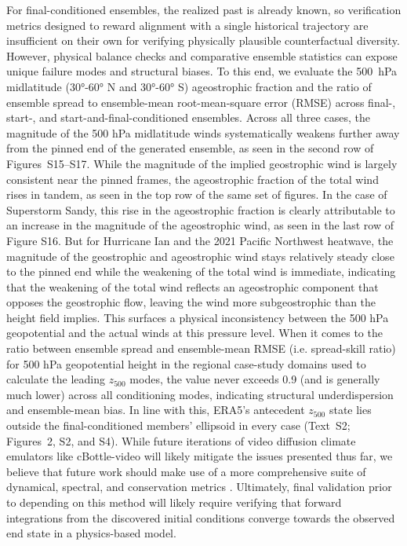 \documentclass[final]{agujournal2019}
\begin{document}
For final-conditioned ensembles, the realized past is already known, so verification metrics designed to reward alignment with a single historical trajectory are insufficient on their own for verifying physically plausible counterfactual diversity. However, physical balance checks and comparative ensemble statistics can expose unique failure modes and structural biases. To this end, we evaluate the 500~hPa midlatitude (\ang{30}-\ang{60} N and \ang{30}-\ang{60} S) ageostrophic fraction and the ratio of ensemble spread to ensemble-mean root-mean-square error (RMSE) across final-, start-, and start-and-final-conditioned ensembles. Across all three cases, the magnitude of the 500 hPa midlatitude winds systematically weakens further away from the pinned end of the generated ensemble, as seen in the second row of Figures~S15--S17. While the magnitude of the implied geostrophic wind is largely consistent near the pinned frames, the ageostrophic fraction of the total wind rises in tandem, as seen in the top row of the same set of figures. In the case of Superstorm Sandy, this rise in the ageostrophic fraction is clearly attributable to an increase in the magnitude of the ageostrophic wind, as seen in the last row of Figure S16. But for Hurricane Ian and the 2021 Pacific Northwest heatwave, the magnitude of the geostrophic and ageostrophic wind stays relatively steady close to the pinned end while the weakening of the total wind is immediate, indicating that the weakening of the total wind reflects an ageostrophic component that opposes the geostrophic flow, leaving the wind more subgeostrophic than the height field implies. This surfaces a physical inconsistency between the 500 hPa geopotential and the actual winds at this pressure level. When it comes to the ratio between ensemble spread and ensemble-mean RMSE (i.e. spread-skill ratio) for 500 hPa geopotential height in the regional case-study domains used to calculate the leading $z_{500}$ modes, the value never exceeds 0.9 (and is generally much lower) across all conditioning modes, indicating structural underdispersion and ensemble-mean bias. In line with this, ERA5's antecedent $z_{500}$ state lies outside the final-conditioned members' ellipsoid in every case (Text~S2; Figures~2, S2, and S4). While future iterations of video diffusion climate emulators like cBottle-video will likely mitigate the issues presented thus far, we believe that future work should make use of a more comprehensive suite of dynamical, spectral, and conservation metrics \cite{Kelder2022-xb, Hakim2024-dq, Kasteleyn2026-jf}. Ultimately, final validation prior to depending on this method will likely require verifying that forward integrations from the discovered initial conditions converge towards the observed end state in a physics-based model.
\end{document}
